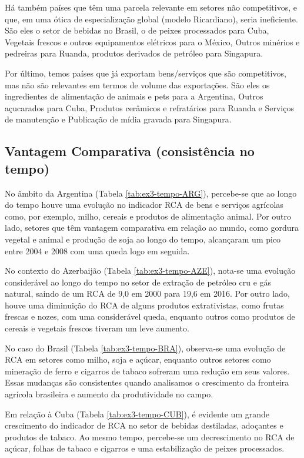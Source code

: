 Há também países que têm uma parcela relevante em setores não competitivos, e que, em uma ótica de especialização global (modelo Ricardiano), seria ineficiente. São eles o setor de bebidas no Brasil, o de peixes processados para Cuba, Vegetais frescos e outros equipamentos elétricos para o México, Outros minérios e pedreiras para Ruanda, produtos derivados de petróleo para Singapura.

Por último, temos países que já exportam bens/serviços que são competitivos, mas não são relevantes em termos de volume das exportações. São eles os ingredientes de alimentação de animais e pets para a Argentina, Outros açucarados para Cuba, Produtos cerâmicos e refratários para Ruanda e Serviços de manutenção e Publicação de mídia gravada para  Singapura.

\subsection{Vantagem Comparativa (consistência no tempo)}

No âmbito da Argentina (Tabela \ref{tab:ex3-tempo-ARG}), percebe-se que ao longo do tempo houve uma evolução no indicador RCA de bens e serviços agrícolas como, por exemplo, milho, cereais e produtos de alimentação animal. Por outro lado, setores que têm vantagem comparativa em relação ao mundo, como gordura vegetal e animal e produção de soja ao longo do tempo, alcançaram um pico entre 2004 e 2008 com uma queda logo em seguida.

No contexto do Azerbaijão (Tabela \ref{tab:ex3-tempo-AZE}), nota-se uma evolução considerável ao longo do tempo no setor de extração de petróleo cru e gás natural, saindo de um RCA de 9,0 em 2000 para 19,6 em 2016. Por outro lado, houve uma diminuição do RCA de alguns produtos extrativistas, como frutas frescas e nozes, com uma considerável queda, enquanto outros como produtos de cereais e vegetais frescos tiveram um leve aumento.

No caso do Brasil (Tabela \ref{tab:ex3-tempo-BRA}), observa-se uma evolução de RCA em setores como milho, soja e açúcar, enquanto outros setores como mineração de ferro e cigarros de tabaco sofreram uma redução em seus valores. Essas mudanças são consistentes quando analisamos o crescimento da fronteira agrícola brasileira e aumento da produtividade no campo.

Em relação à Cuba (Tabela \ref{tab:ex3-tempo-CUB}), é evidente um grande crescimento do indicador de RCA no setor de bebidas destiladas, adoçantes e produtos de tabaco. Ao mesmo tempo, percebe-se um decrescimento no RCA de açúcar, folhas de tabaco e cigarros e uma estabilização de peixes processados. 

